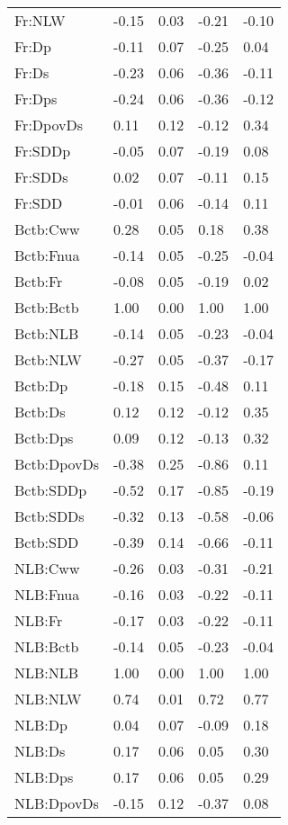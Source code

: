 \begin{center}
\begin{longtable}{|p{0.9in}|p{0.7in}|p{0.7in}|p{0.7in}|p{0.7in}|}
  Fr:NLW & -0.15 & 0.03 & -0.21 & -0.10 \\ 
  Fr:Dp & -0.11 & 0.07 & -0.25 & 0.04 \\ 
  Fr:Ds & -0.23 & 0.06 & -0.36 & -0.11 \\ 
  Fr:Dps & -0.24 & 0.06 & -0.36 & -0.12 \\ 
  Fr:DpovDs & 0.11 & 0.12 & -0.12 & 0.34 \\ 
  Fr:SDDp & -0.05 & 0.07 & -0.19 & 0.08 \\ 
  Fr:SDDs & 0.02 & 0.07 & -0.11 & 0.15 \\ 
  Fr:SDD & -0.01 & 0.06 & -0.14 & 0.11 \\ 
  Bctb:Cww & 0.28 & 0.05 & 0.18 & 0.38 \\ 
  Bctb:Fnua & -0.14 & 0.05 & -0.25 & -0.04 \\ 
  Bctb:Fr & -0.08 & 0.05 & -0.19 & 0.02 \\ 
  Bctb:Bctb & 1.00 & 0.00 & 1.00 & 1.00 \\ 
  Bctb:NLB & -0.14 & 0.05 & -0.23 & -0.04 \\ 
  Bctb:NLW & -0.27 & 0.05 & -0.37 & -0.17 \\ 
  Bctb:Dp & -0.18 & 0.15 & -0.48 & 0.11 \\ 
  Bctb:Ds & 0.12 & 0.12 & -0.12 & 0.35 \\ 
  Bctb:Dps & 0.09 & 0.12 & -0.13 & 0.32 \\ 
  Bctb:DpovDs & -0.38 & 0.25 & -0.86 & 0.11 \\ 
  Bctb:SDDp & -0.52 & 0.17 & -0.85 & -0.19 \\ 
  Bctb:SDDs & -0.32 & 0.13 & -0.58 & -0.06 \\ 
  Bctb:SDD & -0.39 & 0.14 & -0.66 & -0.11 \\ 
  NLB:Cww & -0.26 & 0.03 & -0.31 & -0.21 \\ 
  NLB:Fnua & -0.16 & 0.03 & -0.22 & -0.11 \\ 
  NLB:Fr & -0.17 & 0.03 & -0.22 & -0.11 \\ 
  NLB:Bctb & -0.14 & 0.05 & -0.23 & -0.04 \\ 
  NLB:NLB & 1.00 & 0.00 & 1.00 & 1.00 \\ 
  NLB:NLW & 0.74 & 0.01 & 0.72 & 0.77 \\ 
  NLB:Dp & 0.04 & 0.07 & -0.09 & 0.18 \\ 
  NLB:Ds & 0.17 & 0.06 & 0.05 & 0.30 \\ 
  NLB:Dps & 0.17 & 0.06 & 0.05 & 0.29 \\ 
  NLB:DpovDs & -0.15 & 0.12 & -0.37 & 0.08 \\ 

\end{longtable}
\end{center}
